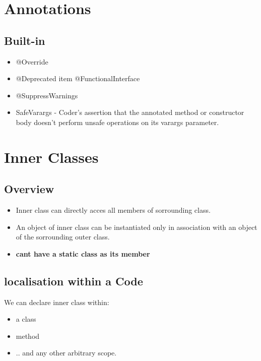 \documentclass{report}
\begin{document}
 
 
\chapter{Annotations}
\section{Built-in}
\begin{itemize}
	\item @Override
	\item @Deprecated
	item @FunctionalInterface
	\item @SuppressWarnings
	\item SafeVarargs - Coder’s assertion that the annotated method or constructor body doesn’t perform unsafe operations on its varargs parameter.
\end{itemize}

\chapter{Inner Classes}
\section{Overview}
\begin{itemize}
	\item Inner class can directly acces all members of sorrounding class. 
	\item An object of inner class can  be instantiated only in association with an object
	of the sorrounding outer class.
	\item \textbf{cant have a static class as its member}
\end{itemize}

\section{localisation within a Code}
We can declare inner class within:
\begin{itemize}
	\item a class
	\item method
	\item .. and any other arbitrary scope.
\end{itemize}
\end{document}
